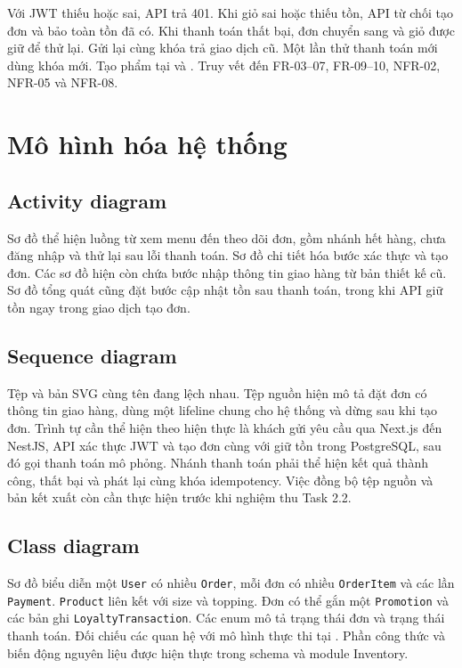 \documentclass[a4paper]{article}
\begin{document}
Với JWT thiếu hoặc sai, API trả 401. Khi giỏ sai hoặc thiếu tồn, API từ chối tạo đơn và bảo toàn tồn đã có. Khi thanh toán thất bại, đơn chuyển sang  và giỏ được giữ để thử lại. Gửi lại cùng khóa trả giao dịch cũ. Một lần thử thanh toán mới dùng khóa mới. Tạo phẩm tại  và . Truy vết đến FR-03--07, FR-09--10, NFR-02, NFR-05 và NFR-08.

\section{Mô hình hóa hệ thống}

\subsection{Activity diagram}
Sơ đồ  thể hiện luồng từ xem menu đến theo dõi đơn, gồm nhánh hết hàng, chưa đăng nhập và thử lại sau lỗi thanh toán. Sơ đồ  chi tiết hóa bước xác thực và tạo đơn. Các sơ đồ hiện còn chứa bước nhập thông tin giao hàng từ bản thiết kế cũ. Sơ đồ tổng quát cũng đặt bước cập nhật tồn sau thanh toán, trong khi API giữ tồn ngay trong giao dịch tạo đơn.

\subsection{Sequence diagram}
Tệp  và bản SVG cùng tên đang lệch nhau. Tệp nguồn hiện mô tả đặt đơn có thông tin giao hàng, dùng một lifeline chung cho hệ thống và dừng sau khi tạo đơn. Trình tự cần thể hiện theo hiện thực là khách gửi yêu cầu qua Next.js đến NestJS, API xác thực JWT và tạo đơn cùng với giữ tồn trong PostgreSQL, sau đó gọi thanh toán mô phỏng. Nhánh thanh toán phải thể hiện kết quả thành công, thất bại và phát lại cùng khóa idempotency. Việc đồng bộ tệp nguồn và bản kết xuất còn cần thực hiện trước khi nghiệm thu Task 2.2.

\subsection{Class diagram}
Sơ đồ  biểu diễn một \texttt{User} có nhiều \texttt{Order}, mỗi đơn có nhiều \texttt{OrderItem} và các lần \texttt{Payment}. \texttt{Product} liên kết với size và topping. Đơn có thể gắn một \texttt{Promotion} và các bản ghi \texttt{LoyaltyTransaction}. Các enum mô tả trạng thái đơn và trạng thái thanh toán. Đối chiếu các quan hệ với mô hình thực thi tại . Phần công thức và biến động nguyên liệu được hiện thực trong schema và module Inventory.
\end{document}
